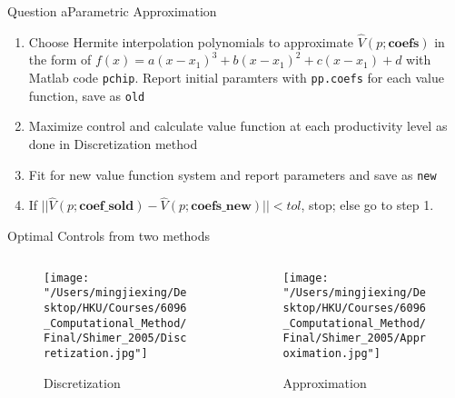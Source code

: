 \documentclass{beamer}
\begin{document}
\begin{frame}{Question a}{Parametric Approximation}
    \begin{enumerate}\addtocounter{enumi}{-1}
        \item Choose Hermite interpolation polynomials to approximate $\hat{V}(p;\textbf{coefs})$ in the form of \(
            f(x) = a (x-x_1)^3 + b(x-x_1)^2 + c(x-x_1)+d 
            \) with Matlab code \texttt{pchip}. Report initial paramters with \texttt{pp.coefs} for each value function, save as \texttt{old}
        \item Maximize control and calculate value function at each productivity level as done in Discretization method
        \item Fit for new value function system and report parameters and save as \texttt{new}
        \item If \(||\hat{V}(p;\textbf{coef\_sold})-\hat{V}(p;\textbf{coefs\_new})||<tol\), stop; else go to step 1.
    \end{enumerate}
\end{frame}

    

\begin{frame}{Optimal Controls from two methods}
    \begin{columns}[c]
            \begin{column}{.5\textwidth}
            \begin{figure}
                \centering
                \texttt{[image: "/Users/mingjiexing/Desktop/HKU/Courses/6096\_Computational\_Method/Final/Shimer\_2005/Discretization.jpg"]}
                \caption{Discretization}
            \end{figure}      
            \end{column}
            \begin{column}{.5\textwidth}
            \begin{figure}
                \centering
                \texttt{[image: "/Users/mingjiexing/Desktop/HKU/Courses/6096\_Computational\_Method/Final/Shimer\_2005/Approximation.jpg"]}
                \caption{Approximation}
            \end{figure}
            \end{column}
        \end{columns}
\end{frame}
\end{document}
